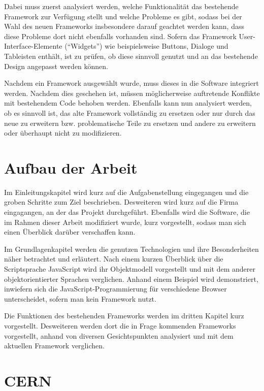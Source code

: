 Dabei muss zuerst analysiert werden, welche Funktionalität das bestehende Framework zur Verfügung
stellt und welche Probleme es gibt, sodass bei der Wahl des neuen Frameworks insbesondere darauf
geachtet werden kann, dass diese Probleme dort nicht ebenfalls vorhanden sind. Sofern das Framework
User-Interface-Elemente (\enquote{Widgets}) wie beispielsweise Buttons, Dialoge und Tableisten
enthält, ist zu prüfen, ob diese sinnvoll genutzt und an das bestehende Design angepasst werden können.

Nachdem ein Framework ausgewählt wurde, muss dieses in die Software integriert werden. Nachdem dies
geschehen ist, müssen möglicherweise auftretende Konflikte mit bestehendem Code behoben werden.
Ebenfalls kann nun analysiert werden, ob es sinnvoll ist, das alte Framework vollständig zu ersetzen
oder nur durch das neue zu erweitern bzw. problematische Teile zu ersetzen und andere zu erweitern
oder überhaupt nicht zu modifizieren.


\section{Aufbau der Arbeit}

Im Einleitungskapitel wird kurz auf die Aufgabenstellung eingegangen und die groben Schritte zum
Ziel beschrieben. Desweiteren wird kurz auf die Firma eingagangen, an der das Projekt durchgeführt.
Ebenfalls wird die Software, die im Rahmen dieser Arbeit modifiziert wurde, kurz vorgestellt, sodass
man sich einen Überblick darüber verschaffen kann.

Im Grundlagenkapitel werden die genutzen Technologien und ihre Besonderheiten näher betrachtet und
erläutert. Nach einem kurzen Überblick über die Scriptsprache JavaScript wird ihr Objektmodell
vorgestellt und mit dem anderer objektorientierter Sprachen verglichen. Anhand einem Beispiel wird
demonstriert, inwiefern sich die JavaScript-Programmierung für verschiedene Browser unterscheidet,
sofern man kein Framework nutzt.

Die Funktionen des bestehenden Frameworks werden im dritten Kapitel kurz vorgestellt. Desweiteren
werden dort die in Frage kommenden Frameworks vorgestellt, anhand von diversen Gesichtspunkten
analysiert und mit dem aktuellen Framework verglichen.



\section{CERN}

